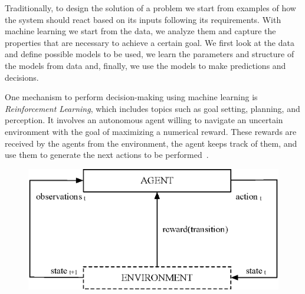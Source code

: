 \documentclass[sigconf,review, anonymous]{acmart}
\begin{document}
Traditionally, to design the solution of a problem we start from examples of how the system should react based on its inputs following its requirements. With machine learning we start from the data, we analyze them and capture the properties that are necessary to achieve a certain goal. We first look at the data and define possible models to be used, we learn the parameters and structure of the models from data and, finally, we use the models to make predictions and decisions. 





One mechanism to perform decision-making using machine learning is \emph{Reinforcement Learning}, which includes topics such as goal setting, planning, and perception. It involves an autonomous agent willing to navigate an uncertain environment with the goal of maximizing a numerical reward. These rewards are received by the agents from the environment, the agent keeps track of them, and use them to generate the next actions to be performed~\cite{sutton}. 
\begin{figure}[h]
  \centering
  \includegraphics[width=.7\linewidth]{figures/reinforcement-learning}
  \label{fig:reinforcement-learning}
\end{figure}
\end{document}
